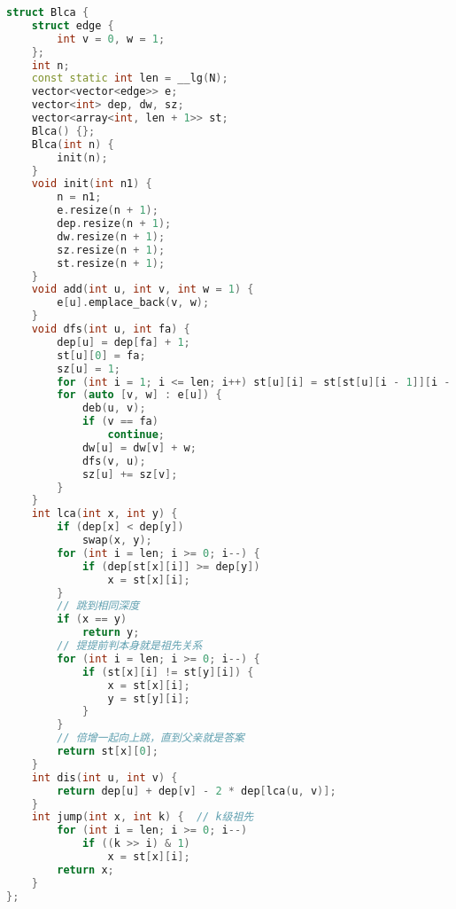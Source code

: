 \begin{lstlisting}[language=C++]
struct Blca {
    struct edge {
        int v = 0, w = 1;
    };
    int n;
    const static int len = __lg(N);
    vector<vector<edge>> e;
    vector<int> dep, dw, sz;
    vector<array<int, len + 1>> st;
    Blca() {};
    Blca(int n) {
        init(n);
    }
    void init(int n1) {
        n = n1;
        e.resize(n + 1);
        dep.resize(n + 1);
        dw.resize(n + 1);
        sz.resize(n + 1);
        st.resize(n + 1);
    }
    void add(int u, int v, int w = 1) {
        e[u].emplace_back(v, w);
    }
    void dfs(int u, int fa) {
        dep[u] = dep[fa] + 1;
        st[u][0] = fa;
        sz[u] = 1;
        for (int i = 1; i <= len; i++) st[u][i] = st[st[u][i - 1]][i - 1];
        for (auto [v, w] : e[u]) {
            deb(u, v);
            if (v == fa)
                continue;
            dw[u] = dw[v] + w;
            dfs(v, u);
            sz[u] += sz[v];
        }
    }
    int lca(int x, int y) {
        if (dep[x] < dep[y])
            swap(x, y);
        for (int i = len; i >= 0; i--) {
            if (dep[st[x][i]] >= dep[y])
                x = st[x][i];
        }
        // 跳到相同深度
        if (x == y)
            return y;
        // 提提前判本身就是祖先关系
        for (int i = len; i >= 0; i--) {
            if (st[x][i] != st[y][i]) {
                x = st[x][i];
                y = st[y][i];
            }
        }
        // 倍增一起向上跳，直到父亲就是答案
        return st[x][0];
    }
    int dis(int u, int v) {
        return dep[u] + dep[v] - 2 * dep[lca(u, v)];
    }
    int jump(int x, int k) {  // k级祖先
        for (int i = len; i >= 0; i--)
            if ((k >> i) & 1)
                x = st[x][i];
        return x;
    }
};
\end{lstlisting}
